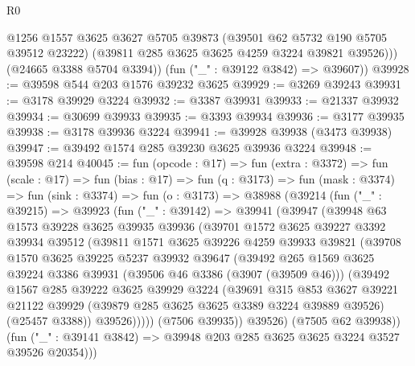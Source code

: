 \begin{lexlean}{R0}
\begin{coremodule}
            @1256
            @1557
            @3625
            @3627
            @5705
            @39873
            (@39501 @62 @5732 @190 @5705 @39512 @23222)
            (@39811 @285 @3625 @3625 @4259 @3224 @39821 @39526)))
        (@24665 @3388 @5704 @3394))
      (fun ("_" : @39122 @3842) => @39607))
@39928 := @39598 @544 @203 @1576 @39232 @3625
@39929 := @3269 @39243
@39931 := @3178 @39929 @3224
@39932 := @3387 @39931
@39933 := @21337 @39932
@39934 := @30699 @39933
@39935 := @3393 @39934
@39936 := @3177 @39935
@39938 := @3178 @39936 @3224
@39941 := @39928 @39938 (@3473 @39938)
@39947 := @39492 @1574 @285 @39230 @3625 @39936 @3224
@39948 := @39598 @214
@40045 := fun (opcode : @17) =>
  fun (extra : @3372) =>
  fun (scale : @17) =>
  fun (bias : @17) =>
  fun (q : @3173) =>
  fun (mask : @3374) =>
  fun (sink : @3374) =>
  fun (o : @3173) =>
  @38988
    (@39214
      (fun ("_" : @39215) =>
      @39923
        (fun ("_" : @39142) =>
        @39941
          (@39947
            (@39948
              @63
              @1573
              @39228
              @3625
              @39935
              @39936
              (@39701
                @1572
                @3625
                @39227
                @3392
                @39934
                @39512
                (@39811
                  @1571
                  @3625
                  @39226
                  @4259
                  @39933
                  @39821
                  (@39708
                    @1570
                    @3625
                    @39225
                    @5237
                    @39932
                    @39647
                    (@39492
                      @265
                      @1569
                      @3625
                      @39224
                      @3386
                      @39931
                      (@39506 @46 @3386 (@3907 (@39509 @46)))
                      (@39492
                        @1567
                        @285
                        @39222
                        @3625
                        @39929
                        @3224
                        (@39691
                          @315
                          @853
                          @3627
                          @39221
                          @21122
                          @39929
                          (@39879 @285 @3625 @3625 @3389 @3224 @39889 @39526)
                          (@25457 @3388))
                        @39526)))))
              (@7506 @39935))
            @39526)
          (@7505 @62 @39938))
        (fun ("_" : @39141 @3842) => @39948 @203 @285 @3625 @3625 @3224 @3527 @39526 @20354)))

\end{coremodule}
\end{lexlean}
